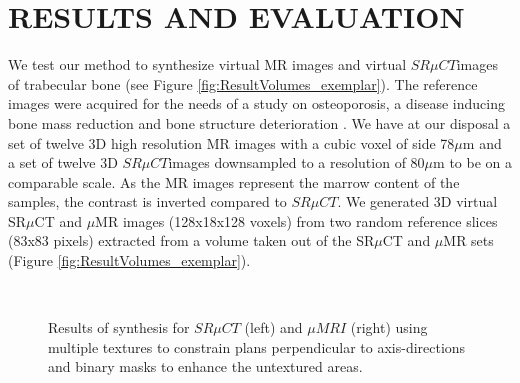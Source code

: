 \section{\uppercase{Results and Evaluation}}
\label{sec:ResultsAndEvaluation}
We test our method to synthesize virtual MR images and virtual $SR \mu{CT}$images of trabecular bone (see Figure \ref{fig:ResultVolumes_exemplar}). 
The reference images were acquired for the needs of a study on osteoporosis, a disease inducing bone mass 
reduction and bone structure deterioration \cite{revol2002}. 
We have at our disposal a set of twelve 3D high resolution MR images with a cubic voxel of side 78$\mu$m and a set of twelve 3D 
$SR \mu{CT}$images downsampled to a resolution of 80$\mu$m to be on a comparable scale. As the MR images represent the marrow content of the samples, 
the contrast is inverted compared to $SR \mu{CT}$.
We generated 3D virtual SR$\mu$CT and $\mu$MR images (128x18x128 voxels) from two random reference slices (83x83 pixels) 
extracted from a volume taken out of the SR$\mu$CT and $\mu$MR sets (Figure \ref{fig:ResultVolumes_exemplar}).  
 
\begin{figure} 
 \centering
 \\
 \caption{Results of synthesis for $SR \mu{CT}$ (left) and $\mu{MRI}$ (right) using multiple textures to constrain plans perpendicular to axis-directions and binary masks to enhance the untextured areas.
         }
 \label{fig:ResultVolumes} 
\end{figure}

